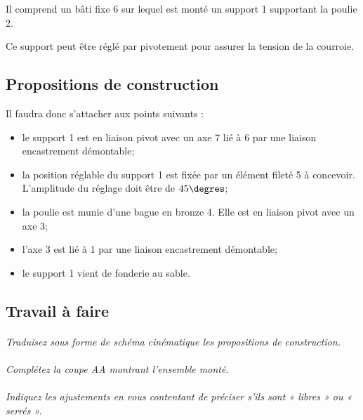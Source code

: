 \documentclass[11pt,oneside]{article}
\begin{document}
\vspace{.5cm}

Il comprend un bâti fixe 6 sur lequel est monté un support 1 supportant la 
poulie 2.

Ce support peut être réglé par pivotement pour assurer la tension de la courroie.

\subsection*{Propositions de construction}
Il faudra donc s’attacher aux points suivants :
\begin{itemize}
\item le support 1 est en liaison pivot avec un axe 7 lié à 6 par une liaison encastrement démontable;
\item la position réglable du support 1 est fixée par un élément fileté 5 à concevoir. L’amplitude du réglage doit être de $45\degres$;
\item la poulie est munie d’une bague en bronze 4. Elle est en liaison pivot avec un axe 3;
\item l’axe 3 est lié à 1 par une liaison encastrement démontable;
\item le support 1 vient de fonderie au sable.
\end{itemize}

\subsection*{Travail à faire}
\paragraph{}
\textit{Traduisez sous forme de schéma cinématique les propositions de construction.}

\paragraph{}
\textit{Complétez la coupe AA montrant l’ensemble monté.}

\paragraph{}
\textit{Indiquez les ajustements en vous contentant de préciser s’ils sont « libres » ou « serrés ».}
\end{document}
